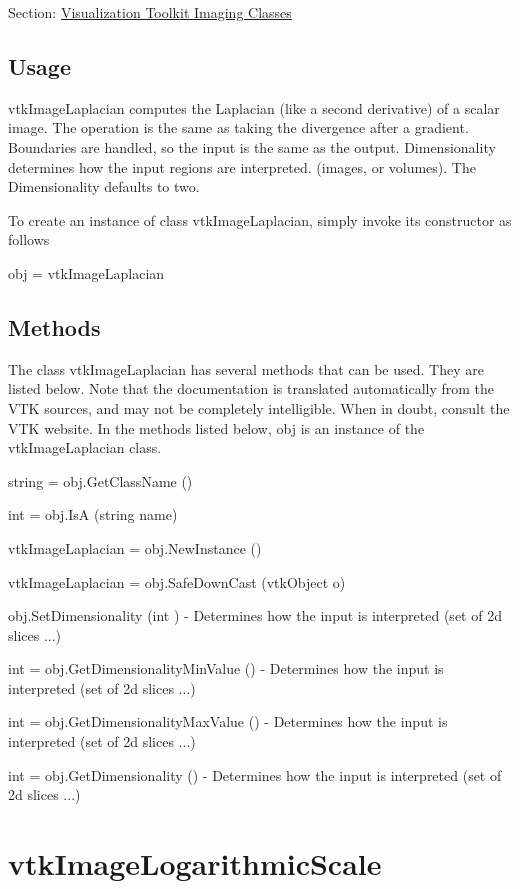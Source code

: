 Section\-: \hyperlink{sec_vtkimaging}{Visualization Toolkit Imaging Classes} \hypertarget{vtkwidgets_vtkxyplotwidget_Usage}{}\subsection{Usage}\label{vtkwidgets_vtkxyplotwidget_Usage}
vtk\-Image\-Laplacian computes the Laplacian (like a second derivative) of a scalar image. The operation is the same as taking the divergence after a gradient. Boundaries are handled, so the input is the same as the output. Dimensionality determines how the input regions are interpreted. (images, or volumes). The Dimensionality defaults to two.

To create an instance of class vtk\-Image\-Laplacian, simply invoke its constructor as follows \begin{DoxyVerb}  obj = vtkImageLaplacian
\end{DoxyVerb}
 \hypertarget{vtkwidgets_vtkxyplotwidget_Methods}{}\subsection{Methods}\label{vtkwidgets_vtkxyplotwidget_Methods}
The class vtk\-Image\-Laplacian has several methods that can be used. They are listed below. Note that the documentation is translated automatically from the V\-T\-K sources, and may not be completely intelligible. When in doubt, consult the V\-T\-K website. In the methods listed below, {\ttfamily obj} is an instance of the vtk\-Image\-Laplacian class. 
\begin{DoxyItemize}
\item {\ttfamily string = obj.\-Get\-Class\-Name ()}  
\item {\ttfamily int = obj.\-Is\-A (string name)}  
\item {\ttfamily vtk\-Image\-Laplacian = obj.\-New\-Instance ()}  
\item {\ttfamily vtk\-Image\-Laplacian = obj.\-Safe\-Down\-Cast (vtk\-Object o)}  
\item {\ttfamily obj.\-Set\-Dimensionality (int )} -\/ Determines how the input is interpreted (set of 2d slices ...)  
\item {\ttfamily int = obj.\-Get\-Dimensionality\-Min\-Value ()} -\/ Determines how the input is interpreted (set of 2d slices ...)  
\item {\ttfamily int = obj.\-Get\-Dimensionality\-Max\-Value ()} -\/ Determines how the input is interpreted (set of 2d slices ...)  
\item {\ttfamily int = obj.\-Get\-Dimensionality ()} -\/ Determines how the input is interpreted (set of 2d slices ...)  
\end{DoxyItemize}\hypertarget{vtkimaging_vtkimagelogarithmicscale}{}\section{vtk\-Image\-Logarithmic\-Scale}\label{vtkimaging_vtkimagelogarithmicscale}
